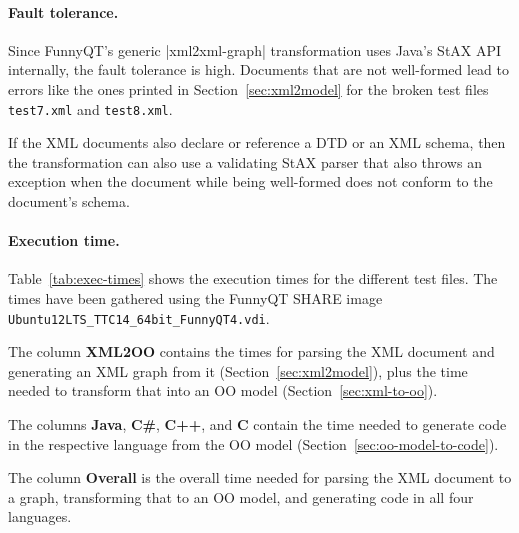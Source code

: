\documentclass[submission]{eptcs}
\newcommand{\code}{\clojureinline}
\begin{document}
\paragraph{Fault tolerance.}
\label{sec:fault-tolerance}

Since FunnyQT's generic \code|xml2xml-graph| transformation uses Java's StAX
API internally, the fault tolerance is high.  Documents that are not
well-formed lead to errors like the ones printed in Section~\ref{sec:xml2model}
for the broken test files \texttt{test7.xml} and \texttt{test8.xml}.

If the XML documents also declare or reference a DTD or an XML schema, then the
transformation can also use a validating StAX parser that also throws an
exception when the document while being well-formed does not conform to the
document's schema.


\paragraph{Execution time.}
\label{sec:execution-time}

Table~\ref{tab:exec-times} shows the execution times for the different test
files.  The times have been gathered using the FunnyQT SHARE image
\texttt{Ubuntu12LTS\_TTC14\_64bit\_FunnyQT4.vdi}.

The column \textbf{XML2OO} contains the times for parsing the XML document and
generating an XML graph from it (Section~\ref{sec:xml2model}), plus the time
needed to transform that into an OO model (Section~\ref{sec:xml-to-oo}).

The columns \textbf{Java}, \textbf{C\#}, \textbf{C++}, and \textbf{C} contain
the time needed to generate code in the respective language from the OO model
(Section~\ref{sec:oo-model-to-code}).

The column \textbf{Overall} is the overall time needed for parsing the XML
document to a graph, transforming that to an OO model, and generating code in
all four languages.
\end{document}
